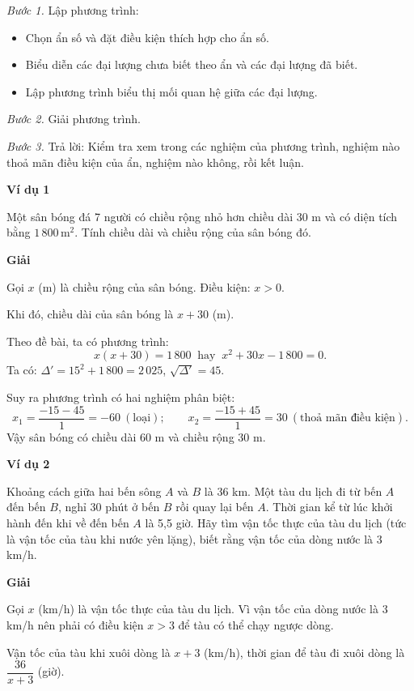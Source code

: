\begin{lesson}
    \textit{Bước 1.} Lập phương trình:
    \begin{itemize}
        \item Chọn ẩn số và đặt điều kiện thích hợp cho ẩn số.
        \item Biểu diễn các đại lượng chưa biết theo ẩn và các đại lượng đã biết.
        \item Lập phương trình biểu thị mối quan hệ giữa các đại lượng.
    \end{itemize}

    \textit{Bước 2.} Giải phương trình.

    \textit{Bước 3.} Trả lời: Kiểm tra xem trong các nghiệm của phương trình, nghiệm nào thoả mãn điều kiện của ẩn, nghiệm nào không, rồi kết luận.

    \textbf{Ví dụ 1}

    Một sân bóng đá 7 người có chiều rộng nhỏ hơn chiều dài 30 m và có diện tích bằng $1\,800\,\text{m}^2$. Tính chiều dài và chiều rộng của sân bóng đó.

    \textbf{Giải}

    Gọi $x$ (m) là chiều rộng của sân bóng. Điều kiện: $x>0$.

    Khi đó, chiều dài của sân bóng là $x+30$ (m).

    Theo đề bài, ta có phương trình:
    \[
        x(x+30)=1\,800\ \text{ hay }\ x^2+30x-1\,800=0.
    \]
    Ta có: $\Delta'=15^2+1\,800=2\,025$, $\sqrt{\Delta'}=45$.

    Suy ra phương trình có hai nghiệm phân biệt:
    \[
        x_1=\dfrac{-15-45}{1}=-60\ (\text{loại});\qquad
        x_2=\dfrac{-15+45}{1}=30\ (\text{thoả mãn điều kiện}).
    \]
    Vậy sân bóng có chiều dài 60 m và chiều rộng 30 m.

    \textbf{Ví dụ 2}

    Khoảng cách giữa hai bến sông $A$ và $B$ là 36 km. Một tàu du lịch đi từ bến $A$ đến bến $B$, nghỉ 30 phút ở bến $B$ rồi quay lại bến $A$. Thời gian kể từ lúc khởi hành đến khi về đến bến $A$ là 5,5 giờ. Hãy tìm vận tốc thực của tàu du lịch (tức là vận tốc của tàu khi nước yên lặng), biết rằng vận tốc của dòng nước là 3 km/h.

    \textbf{Giải}

    Gọi $x$ (km/h) là vận tốc thực của tàu du lịch. Vì vận tốc của dòng nước là 3 km/h nên phải có điều kiện $x>3$ để tàu có thể chạy ngược dòng.

    Vận tốc của tàu khi xuôi dòng là $x+3$ (km/h), thời gian để tàu đi xuôi dòng là $\dfrac{36}{x+3}$ (giờ).


\end{lesson}
